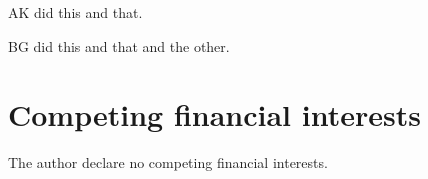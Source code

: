 \documentclass[english]{article}
\begin{document}
AK did this and that. 

BG did this and that and the other. 


\section*{Competing financial interests}

The author declare no competing financial interests.






%



%







%
%






%
%
\end{document}
